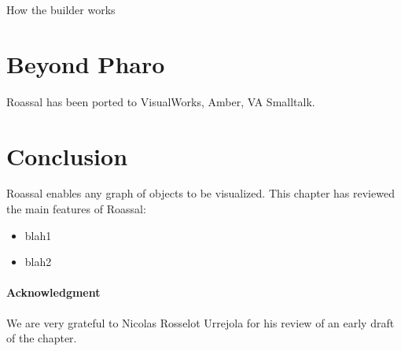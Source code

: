 \documentclass[a4paper,10pt,twoside]{book}
\begin{document}
How the builder works

\section{Beyond Pharo}

Roassal has been ported to VisualWorks, Amber, VA Smalltalk.



\section{Conclusion}

Roassal enables any graph of objects to be visualized. This chapter has reviewed the main features of Roassal:
\begin{itemize}
\item blah1
\item blah2
\end{itemize}

\paragraph{Acknowledgment}
We are very grateful to Nicolas Rosselot Urrejola for his review of an early draft of the chapter.

%
%


\ifx\wholebook\relax\else
   
   
\end{document}
